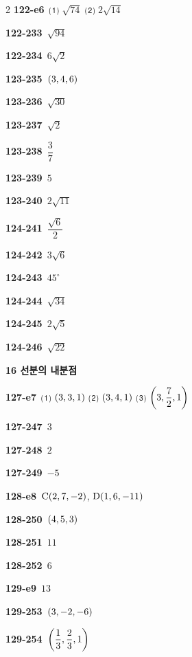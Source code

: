 \documentclass[10pt,a4paper]{article}
\newcommand{\pt}[1]{\mathrm{#1}}
\begin{document}
\begin{multicols}{2}
\noindent\textbf{122-e6}\ ⑴ $\sqrt{74}$ ⑵ $2\sqrt{14}$\par
\noindent\textbf{122-233}\ $\sqrt{94}$\par
\noindent\textbf{122-234}\ $6\sqrt{2}$\par
\noindent\textbf{123-235}\ $(3{,}\mkern3mu\mathopen{}4{,}\mkern3mu\mathopen{}6)$\par
\noindent\textbf{123-236}\ $\sqrt{30}$\par
\noindent\textbf{123-237}\ $\sqrt{2}$\par
\noindent\textbf{123-238}\ $\dfrac{3}{7}$\par
\noindent\textbf{123-239}\ $5$\par
\noindent\textbf{123-240}\ $2\sqrt{11}$\par
\noindent\textbf{124-241}\ $\dfrac{\sqrt{6}}{2}$\par
\noindent\textbf{124-242}\ $3\sqrt{6}$\par
\noindent\textbf{124-243}\ $45^\circ$\par
\noindent\textbf{124-244}\ $\sqrt{34}$\par
\noindent\textbf{124-245}\ $2\sqrt{5}$\par
\noindent\textbf{124-246}\ $\sqrt{22}$\par
\noindent\textbf{16 선분의 내분점}\par\smallskip
\noindent\textbf{127-e7}\ ⑴ $(3{,}\mkern3mu\mathopen{}3{,}\mkern3mu\mathopen{}1)$ ⑵ $(3{,}\mkern3mu\mathopen{}4{,}\mkern3mu\mathopen{}1)$ ⑶ $\left(3{,}\mkern3mu\mathopen{}\dfrac{7}{2}{,}\mkern3mu\mathopen{}1\right)$\par
\noindent\textbf{127-247}\ $3$\par
\noindent\textbf{127-248}\ $2$\par
\noindent\textbf{127-249}\ $-5$\par
\noindent\textbf{128-e8}\ $\pt{C}(2{,}\mkern3mu\mathopen{}7{,}\mkern3mu\mathopen{}-2)$, $\pt{D}(1{,}\mkern3mu\mathopen{}6{,}\mkern3mu\mathopen{}-11)$\par
\noindent\textbf{128-250}\ $(4{,}\mkern3mu\mathopen{}5{,}\mkern3mu\mathopen{}3)$\par
\noindent\textbf{128-251}\ $11$\par
\noindent\textbf{128-252}\ $6$\par
\noindent\textbf{129-e9}\ $13$\par
\noindent\textbf{129-253}\ $(3{,}\mkern3mu\mathopen{}-2{,}\mkern3mu\mathopen{}-6)$\par
\noindent\textbf{129-254}\ $\left(\dfrac{1}{3}{,}\mkern3mu\mathopen{}\dfrac{2}{3}{,}\mkern3mu\mathopen{}1\right)$\par

\end{multicols}
\end{document}
